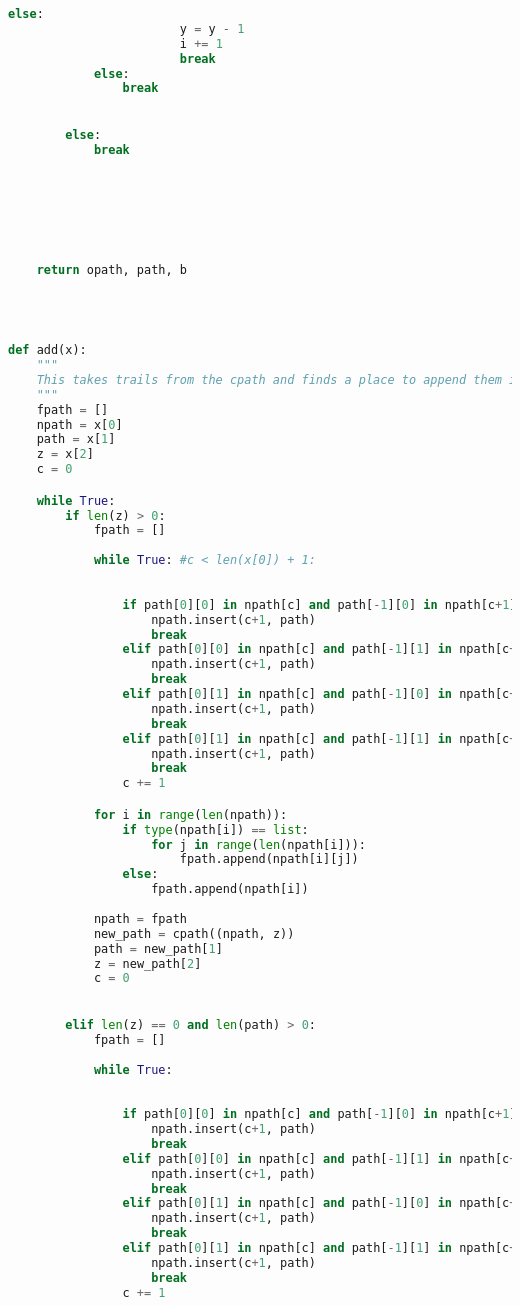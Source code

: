 \documentclass{article}
\begin{document}
\begin{lstlisting}[language=Python]
                    else:
                        y = y - 1
                        i += 1
                        break
            else:
                break
                

        else:
            break
            

            
            
            
                    
            
    return opath, path, b



    
def add(x):
    """
    This takes trails from the cpath and finds a place to append them in the trail created by either euler_tour or euler_trail.
    """
    fpath = []
    npath = x[0]
    path = x[1]
    z = x[2]
    c = 0

    while True:
        if len(z) > 0:
            fpath = []
        
            while True: #c < len(x[0]) + 1:
            
        
                if path[0][0] in npath[c] and path[-1][0] in npath[c+1]:
                    npath.insert(c+1, path)
                    break
                elif path[0][0] in npath[c] and path[-1][1] in npath[c+1]:
                    npath.insert(c+1, path)
                    break
                elif path[0][1] in npath[c] and path[-1][0] in npath[c+1]:
                    npath.insert(c+1, path)
                    break
                elif path[0][1] in npath[c] and path[-1][1] in npath[c+1]:
                    npath.insert(c+1, path)
                    break
                c += 1     

            for i in range(len(npath)):
                if type(npath[i]) == list:
                    for j in range(len(npath[i])):
                        fpath.append(npath[i][j])
                else:
                    fpath.append(npath[i])
                    
            npath = fpath
            new_path = cpath((npath, z))
            path = new_path[1]
            z = new_path[2]
            c = 0
            

        elif len(z) == 0 and len(path) > 0:
            fpath = []
        
            while True: 
            
        
                if path[0][0] in npath[c] and path[-1][0] in npath[c+1]:
                    npath.insert(c+1, path)
                    break
                elif path[0][0] in npath[c] and path[-1][1] in npath[c+1]:
                    npath.insert(c+1, path)
                    break
                elif path[0][1] in npath[c] and path[-1][0] in npath[c+1]:
                    npath.insert(c+1, path)
                    break
                elif path[0][1] in npath[c] and path[-1][1] in npath[c+1]:
                    npath.insert(c+1, path)
                    break
                c += 1     


\end{lstlisting}
\end{document}
